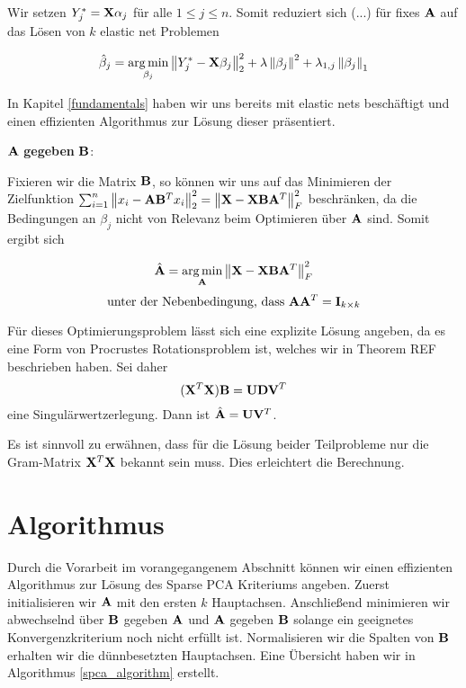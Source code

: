 Wir setzen $Y_j^* = \mathbf{X} \alpha_j$ für alle $1 \leq j \leq n$. Somit reduziert sich (...) für fixes $\mathbf{A}$ auf das Lösen von $k$ elastic net Problemen

$$\hat{\beta}_j = \operatorname*{arg\,min}_{\beta_j} \left\lVert Y_j^* - \mathbf{X} \beta_j \right\rVert_2^2 + \lambda \left\lVert \beta_j \right\rVert^2 + \lambda_{1,j}\left\lVert \beta_j \right\rVert_1$$

In Kapitel \ref{fundamentals} haben wir uns bereits mit elastic nets beschäftigt und einen effizienten Algorithmus zur Lösung dieser präsentiert.

$\mathbf{A}$ \textbf{gegeben} $\mathbf{B}$:

Fixieren wir die Matrix $\mathbf{B}$, so können wir uns auf das Minimieren der Zielfunktion $\sum_{i=1}^{n} \left\lVert x_i - \mathbf{A}\mathbf{B}^Tx_i \right\rVert_2^2 = \left\lVert \mathbf{X} - \mathbf{X} \mathbf{B} \mathbf{A}^T \right\rVert_F^{2}$ beschränken, da die Bedingungen an $\beta_j$ nicht von Relevanz beim Optimieren über $\mathbf{A}$ sind. Somit ergibt sich 

$$\hat{\mathbf{A}} = \operatorname*{arg\,min}_{\mathbf{A}}\left\lVert \mathbf{X} - \mathbf{X} \mathbf{B} \mathbf{A}^T \right\rVert_F^2$$
$$\text{unter der Nebenbedingung, dass } \mathbf{A} \mathbf{A}^T = \mathbf{I}_{k \times k}$$

Für dieses Optimierungsproblem lässt sich eine explizite Lösung angeben, da es eine Form von Procrustes Rotationsproblem ist, welches wir in Theorem REF beschrieben haben. Sei daher 
$$(\mathbf{X}^T \mathbf{X}) \mathbf{B} = \mathbf{U} \mathbf{D} \mathbf{V}^T$$ eine Singulärwertzerlegung. Dann ist $\hat{\mathbf{A}} = \mathbf{U} \mathbf{V}^T$.

Es ist sinnvoll zu erwähnen, dass für die Lösung beider Teilprobleme nur die Gram-Matrix $\mathbf{X}^T \mathbf{X}$ bekannt sein muss. Dies erleichtert die Berechnung.

\section{Algorithmus}

Durch die Vorarbeit im vorangegangenem Abschnitt können wir einen effizienten Algorithmus zur Lösung des Sparse PCA Kriteriums angeben. Zuerst initialisieren wir $\mathbf{A}$ mit den ersten $k$ Hauptachsen. Anschließend minimieren wir abwechselnd über $\mathbf{B}$ gegeben $\mathbf{A}$ und $\mathbf{A}$ gegeben $\mathbf{B}$ solange ein geeignetes Konvergenzkriterium noch nicht erfüllt ist. Normalisieren wir die Spalten von $\mathbf{B}$ erhalten wir die dünnbesetzten Hauptachsen. Eine Übersicht haben wir in Algorithmus \ref{spca_algorithm} erstellt.

